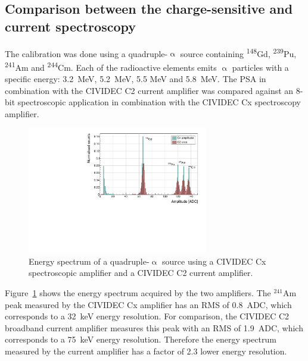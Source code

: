\subsection{Comparison between the charge-sensitive and current spectroscopy}
The calibration was done using a quadruple-$\upalpha$ source containing \textsuperscript{148}Gd, \textsuperscript{239}Pu, \textsuperscript{241}Am and \textsuperscript{244}Cm. Each of the radioactive elements emits $\upalpha$ particles with a specific energy: 3.2~MeV, 5.2~MeV, 5.5 MeV and 5.8~MeV. The PSA in combination with the CIVIDEC C2 current amplifier was compared against an 8-bit spectroscopic application in combination with the CIVIDEC Cx spectroscopy amplifier.%

\begin{figure}[!t]
\centering
\includegraphics[width=0.7\textwidth]{../scripts/05_current_monitoring/plot4alpha/plots/4alphaCompare}
\caption{Energy spectrum of a quadruple-$\upalpha$ source using a CIVIDEC Cx spectroscopic amplifier and a CIVIDEC C2 current amplifier.}
\label{fig:c2cx4alpha}
\end{figure}

Figure~\ref{fig:c2cx4alpha} shows the energy spectrum acquired by the two amplifiers. The $^{241}$Am peak measured by the CIVIDEC Cx amplifier has an RMS of 0.8~ADC, which corresponds to a 32~keV energy resolution. For comparison, the CIVIDEC C2 broadband current amplifier measures this peak with an RMS of 1.9~ADC, which corresponds to a 75~keV energy resolution. Therefore the energy spectrum measured by the current amplifier has a factor of 2.3 lower energy resolution.









